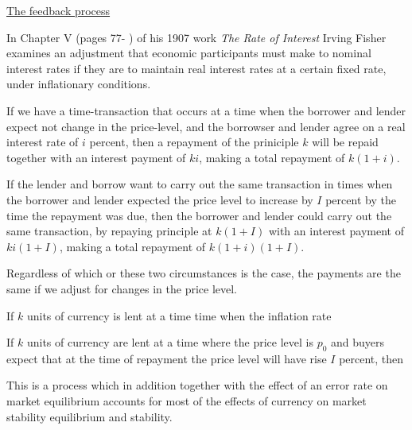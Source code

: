 \underline{The feedback process}

In Chapter V (pages 77-   ) of his 1907 work \textit{The Rate of Interest} Irving Fisher examines an
adjustment that economic participants must make to nominal interest rates if they are to maintain
real interest rates at a certain fixed rate, under inflationary conditions.

If we have a time-transaction that occurs at a time when the borrower and lender expect not change
in the price-level, and the borrowser and lender agree on a real interest rate of $i$ percent, then
a repayment of the priniciple $k$ will be repaid together with an interest payment of $ki$, making a
total repayment of $k(1+i)$.

If the lender and borrow want to carry out the same transaction in times when the borrower and
lender expected the price level to increase by $I$ percent by the time the repayment was due, then
the borrower and lender could carry out the same transaction, by repaying principle at $k(1+I)$ with
an interest payment of $ki(1+I)$, making a total repayment of $k(1+i)(1+I)$.

Regardless of which or these two circumstances is the case, the payments are the same if we adjust
for changes in the price level.

 





If $k$ units of currency is lent at a time time when the inflation rate

If $k$ units of currency are lent at a time where the price level is $p_0$ and buyers expect that at
the time of repayment the price level will have rise $I$ percent, then







This is a process which in addition together with the effect of an error rate on market equilibrium
accounts for most of the effects of currency on market stability equilibrium and stability.


